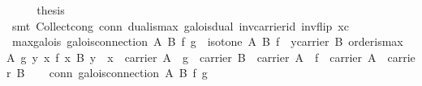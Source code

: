 \begin{isabellebody}
\ \ \isamarkupfalse%
\ \isamarkupfalse%
\ {}thesis\isanewline
\ \ \ \ \isamarkupfalse%
\ {}smt\ Collect{}cong\ conn\ dual{}is{}max\ galois{}dual\ inv{}carrier{}id\ inv{}flip\ xc{}\isanewline
{}\isamarkupfalse%
%
\endisatagproof
{\isafoldproof}%
%
\isadelimproof
\isanewline
%
\endisadelimproof
\isanewline
{}\isamarkupfalse%
\ max{}galois{}\ {}galois{}connection\ A\ B\ f\ g\ {}\ {}isotone\ A\ B\ f\ {}\ {}{}y{}carrier\ B{}\ order{}is{}max\ A\ {}g\ y{}\ {}x{}\ f\ x\ {}\isactrlbsub B\isactrlesub \ y\ {}\ x\ {}\ carrier\ A{}{}\ {}\ g\ {}\ carrier\ B\ {}\ carrier\ A\ {}\ f\ {}\ carrier\ A\ {}\ carrier\ B{}{}\isanewline
%
\isadelimproof
%
\endisadelimproof
%
\isatagproof
{}\isamarkupfalse%
\isanewline
\ \ \isamarkupfalse%
\ conn{}\ {}galois{}connection\ A\ B\ f\ g{}\isanewline
\ \ \isamarkupfalse%

\end{isabellebody}
